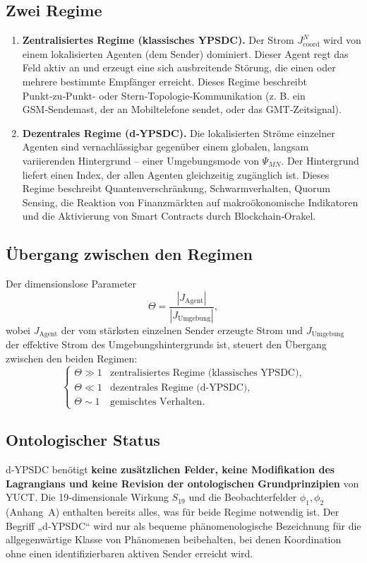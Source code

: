 \documentclass[12pt,a4paper]{article}
\begin{document}
	\subsection{Zwei Regime}
	\begin{enumerate}[leftmargin=*, label=\textbf{(\arabic*)}]
		\item \textbf{Zentralisiertes Regime (klassisches YPSDC).} Der Strom \(J^{N}_{\mathrm{coord}}\) wird von einem lokalisierten Agenten (dem Sender) dominiert. Dieser Agent regt das Feld aktiv an und erzeugt eine sich ausbreitende Störung, die einen oder mehrere bestimmte Empfänger erreicht. Dieses Regime beschreibt Punkt‑zu‑Punkt- oder Stern‑Topologie‑Kommunikation (z. B. ein GSM‑Sendemast, der an Mobiltelefone sendet, oder das GMT‑Zeitsignal).
		
		\item \textbf{Dezentrales Regime (d‑YPSDC).} Die lokalisierten Ströme einzelner Agenten sind vernachlässigbar gegenüber einem globalen, langsam variierenden Hintergrund – einer Umgebungsmode von \(\Psi_{MN}\). Der Hintergrund liefert einen Index, der allen Agenten gleichzeitig zugänglich ist. Dieses Regime beschreibt Quantenverschränkung, Schwarmverhalten, Quorum Sensing, die Reaktion von Finanzmärkten auf makroökonomische Indikatoren und die Aktivierung von Smart Contracts durch Blockchain‑Orakel.
	\end{enumerate}
	
	\subsection{Übergang zwischen den Regimen}
	Der dimensionslose Parameter
	\[
	\Theta = \frac{|J_{\mathrm{Agent}}|}{|J_{\mathrm{Umgebung}}|},
	\]
	wobei \(J_{\mathrm{Agent}}\) der vom stärksten einzelnen Sender erzeugte Strom und \(J_{\mathrm{Umgebung}}\) der effektive Strom des Umgebungshintergrunds ist, steuert den Übergang zwischen den beiden Regimen:
	\[
	\begin{cases}
		\Theta \gg 1 & \text{zentralisiertes Regime (klassisches YPSDC)}, \\
		\Theta \ll 1 & \text{dezentrales Regime (d‑YPSDC)}, \\
		\Theta \sim 1 & \text{gemischtes Verhalten}.
	\end{cases}
	\]
	
	\subsection{Ontologischer Status}
	d‑YPSDC benötigt \textbf{keine zusätzlichen Felder, keine Modifikation des Lagrangians und keine Revision der ontologischen Grundprinzipien} von YUCT. Die 19‑dimensionale Wirkung \(S_{19}\) und die Beobachterfelder \(\phi_1,\phi_2\) (Anhang~A) enthalten bereits alles, was für beide Regime notwendig ist. Der Begriff „d‑YPSDC“ wird nur als bequeme phänomenologische Bezeichnung für die allgegenwärtige Klasse von Phänomenen beibehalten, bei denen Koordination ohne einen identifizierbaren aktiven Sender erreicht wird.
	
\end{document}
